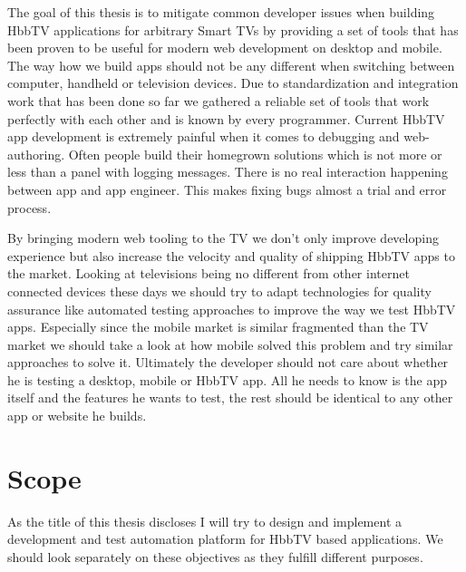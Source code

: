 The goal of this thesis is to mitigate common developer issues when building HbbTV applications for arbitrary Smart TVs by providing a set of tools that has been proven to be useful for modern web development on desktop and mobile. The way how we build apps should not be any different when switching between computer, handheld or television devices. Due to standardization and integration work that has been done so far we gathered a reliable set of tools that work perfectly with each other and is known by every programmer. Current HbbTV app development is extremely painful when it comes to debugging and web-authoring. Often people build their homegrown solutions which is not more or less than a panel with logging messages. There is no real interaction happening between app and app engineer. This makes fixing bugs almost a trial and error process.

By bringing modern web tooling to the TV we don't only improve developing experience but also increase the velocity and quality of shipping HbbTV apps to the market. Looking at televisions being no different from other internet connected devices these days we should try to adapt technologies for quality assurance like automated testing approaches to improve the way we test HbbTV apps. Especially since the mobile market is similar fragmented than the TV market we should take a look at how mobile solved this problem and try similar approaches to solve it. Ultimately the developer should not care about whether he is testing a desktop, mobile or HbbTV app. All he needs to know is the app itself and the features he wants to test, the rest should be identical to any other app or website he builds.

\section{Scope\label{sec:scope}}

As the title of this thesis discloses I will try to design and implement a development and test automation platform for HbbTV based applications. We should look separately on these objectives as they fulfill different purposes.

